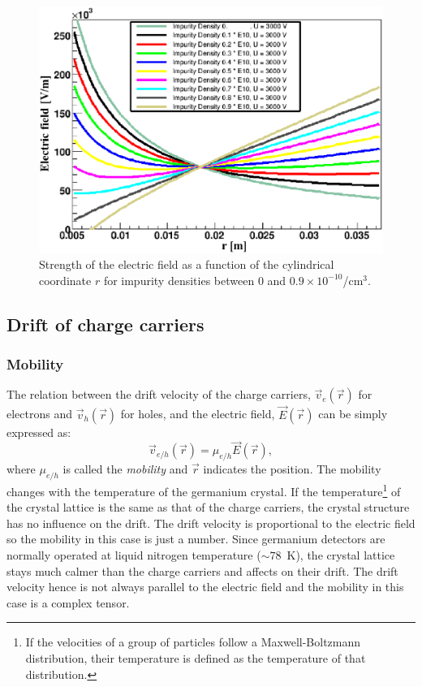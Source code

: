 \documentclass[epj]{svjour}
\begin{document}
\begin{figure}[htbp]
\centering
\includegraphics[width=\linewidth]{rho} 
\caption{Strength of the electric field as a function of the
cylindrical coordinate $r$ for impurity densities between 0 and $0.9
\times 10^{-10}$/cm$^{3}$.}
\label{f:rho} 
\end{figure} 

\subsection{Drift of charge carriers} 
\label{sec:pss:mobi} 
\subsubsection{Mobility} 
\label{sec:pss:mobi} 
The relation between the drift velocity of the charge carriers,
$\vec{v}_{e}(\vec{r})$ for electrons and $\vec{v}_{h}(\vec{r})$ for
holes, and the electric field, $\vec{E}(\vec{r})$ can be simply
expressed as:
\begin{equation} 
\label{eq:det:dv}
\vec{v}_{e/h} (\vec{r})= \mu_{e/h} \vec{E}(\vec{r}),
\end{equation}
where $\mu_{e/h}$ is called the \emph{mobility} and $\vec{r}$
indicates the position. The mobility changes with the temperature of
the germanium crystal. If the temperature\footnote{If the velocities
of a group of particles follow a Maxwell-Boltzmann distribution, their
temperature is defined as the temperature of that distribution.} of
the crystal lattice is the same as that of the charge carriers, the
crystal structure has no influence on the drift. The drift velocity is
proportional to the electric field so the mobility in this case is
just a number. Since germanium detectors are normally operated at
liquid nitrogen temperature ($\sim78$~K), the crystal lattice stays
much calmer than the charge carriers and affects on their drift. The
drift velocity hence is not always parallel to the electric field and
the mobility in this case is a complex tensor.
\end{document}
